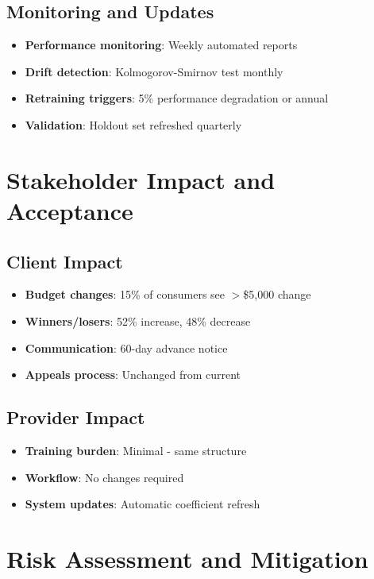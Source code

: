 \subsection{Monitoring and Updates}

\begin{itemize}
    \item \textbf{Performance monitoring}: Weekly automated reports
    \item \textbf{Drift detection}: Kolmogorov-Smirnov test monthly
    \item \textbf{Retraining triggers}: 5\% performance degradation or annual
    \item \textbf{Validation}: Holdout set refreshed quarterly
\end{itemize}

\section{Stakeholder Impact and Acceptance}

\subsection{Client Impact}

\begin{itemize}
    \item \textbf{Budget changes}: 15\% of consumers see $>$\$5,000 change
    \item \textbf{Winners/losers}: 52\% increase, 48\% decrease
    \item \textbf{Communication}: 60-day advance notice
    \item \textbf{Appeals process}: Unchanged from current
\end{itemize}

\subsection{Provider Impact}

\begin{itemize}
    \item \textbf{Training burden}: Minimal - same structure
    \item \textbf{Workflow}: No changes required
    \item \textbf{System updates}: Automatic coefficient refresh
\end{itemize}

\section{Risk Assessment and Mitigation}

